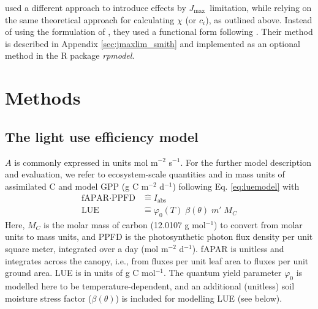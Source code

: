\documentclass{myreport}
\newcommand{\jmax}{$J_{\text{max}}$}
\begin{document}
\citet{smith19ecollett} used a different approach to introduce effects by \jmax\ limitation, while relying on the same theoretical approach for calculating $\chi$ (or $c_i$), as outlined above. Instead of using the formulation of \citet{smith37}, they used a functional form following \citet{farquhar84}. Their method is described in Appendix \ref{sec:jmaxlim_smith} and implemented as an optional method in the R package \textit{rpmodel}.

\section{Methods}
\label{sec:methods}

\subsection{The light use efficiency model}
\label{sec:luemodel}
$A$ is commonly expressed in units mol m$^{-2}$ s$^{-1}$. For the further model description and evaluation, we refer to ecosystem-scale quantities and in mass units of assimilated C and model GPP (g C m$^{-2}$ d$^{-1}$) following Eq. \ref{eq:luemodel}
with 
\begin{align}
    \label{eq:iabs_identification}
    \text{fAPAR} \cdot \text{PPFD} &\mathrel{\widehat{=}} I_{\text{abs}} \\
    \label{eq:lue_identification}
    \text{LUE} &\mathrel{\widehat{=}} \varphi_0(T) \; \beta(\theta) \; m' \; M_C
\end{align}
Here, $M_C$ is the molar mass of carbon (12.0107 g mol$^{-1}$) to convert from molar units to mass units, and PPFD is the photosynthetic photon flux density per unit square meter, integrated over a day (mol m$^{-2}$ d$^{-1}$). fAPAR is unitless and integrates across the canopy, i.e., from fluxes per unit leaf area to fluxes per unit ground area. LUE is in units of g C mol$^{-1}$. The quantum yield parameter $\varphi_0$ is modelled here to be temperature-dependent, and an additional (unitless) soil moisture stress factor ($\beta (\theta)$) is included for modelling LUE (see below).
\end{document}

